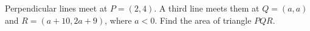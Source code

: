 Perpendicular lines meet at $ P=(2,4)$. A third line meets them at $ Q=(a,a)$ and $ R=(a+10,2a+9)$, where $ a<0 $. Find the area of triangle $ PQR $.
